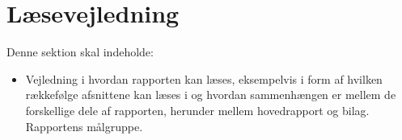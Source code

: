 \section{Læsevejledning}
Denne sektion skal indeholde:

\begin{itemize}
    \item Vejledning i hvordan rapporten kan læses, eksempelvis i form af hvilken rækkefølge afsnittene kan læses i og hvordan sammenhængen er mellem de forskellige dele af rapporten, herunder mellem hovedrapport og bilag. Rapportens målgruppe.
\end{itemize}{}